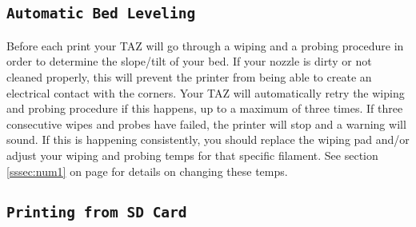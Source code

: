 \subsection{\texttt{Automatic Bed Leveling}}
Before each print your TAZ will go through a wiping and a probing procedure in order to determine the slope/tilt of your bed. If your nozzle is dirty or not cleaned properly, this will prevent the printer from being able to create an electrical contact with the corners. Your TAZ will automatically retry the wiping and probing procedure if this happens, up to a maximum of three times. If three consecutive wipes and probes have failed, the printer will stop and a warning will sound. If this is happening consistently, you should replace the wiping pad and/or adjust your wiping and probing temps for that specific filament. See section \ref{sssec:num1} on page \pageref{sssec:num1} for details on changing these temps.







\subsection{\texttt{Printing from SD Card}}

